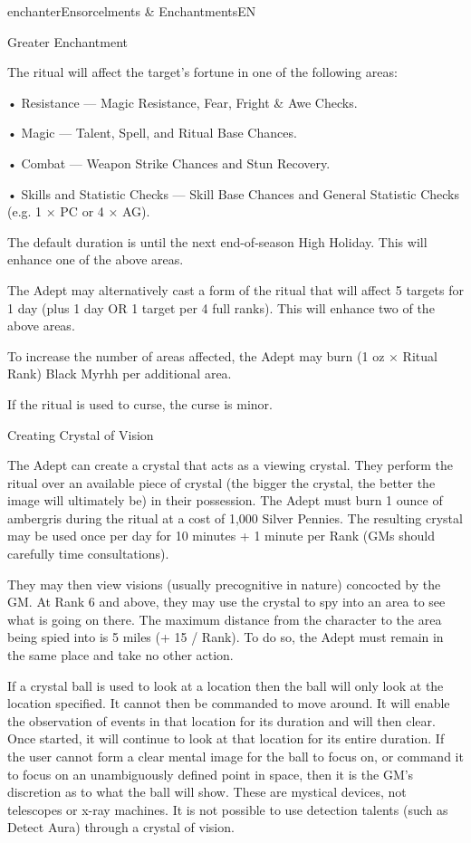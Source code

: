 \begin{College}[1.1]{enchanter}{Ensorcelments \& Enchantments}{EN}
\begin{ritual}[Q-1]{Greater Enchantment}
\begin{effects}
The ritual will affect the target’s fortune in one of 
the following areas:  

• Resistance — Magic Resistance, Fear, Fright \& Awe Checks.

• Magic — Talent, Spell, and Ritual Base Chances.

• Combat — Weapon Strike Chances and Stun Recovery.

• Skills and Statistic Checks — Skill Base Chances and General
Statistic Checks (e.g.  1 × PC or 4 × AG).

The default duration is until the next end-of-season High Holiday.
This will enhance one of the above areas.

The Adept may alternatively cast a form of the ritual that will affect
5 targets for 1 day (plus 1 day OR 1 target per 4 full ranks).  This
will enhance two of the above areas.

To increase the number of areas affected, the Adept may burn (1 oz ×
Ritual Rank) Black Myrhh per additional area.

If the ritual is used to curse, the curse is minor.
\end{effects}
\end{ritual}

\begin{ritual}[Q-2]{Creating Crystal of Vision}

\begin{effects}
The Adept can create a crystal that acts as a viewing crystal.  They
perform the ritual over an available piece of crystal (the bigger the
crystal, the better the image will ultimately be) in their possession.
The Adept must burn 1 ounce of ambergris during the ritual at a cost
of 1,000 Silver Pennies.  The resulting crystal may be used once per
day for 10 minutes + 1 minute per Rank (GMs should carefully time
consultations).

They may then view visions (usually precognitive in nature) concocted
by the GM.  At Rank 6 and above, they may use the crystal to spy into
an area to see what is going on there.  The maximum distance from the
character to the area being spied into is 5 miles (+ 15 / Rank). To do
so, the Adept must remain in the same place and take no other action.

If a crystal ball is used to look at a location then the ball will
only look at the location specified.  It cannot then be commanded to
move around. It will enable the observation of events in that location
for its duration and will then clear. Once started, it will continue
to look at that location for its entire duration.  If the user cannot
form a clear mental image for the ball to focus on, or command it to
focus on an unambiguously defined point in space, then it is the GM’s
discretion as to what the ball will show.  These are mystical devices,
not telescopes or x-ray machines. It is not possible to use detection
talents (such as Detect Aura) through a crystal of vision.
\end{effects}
\end{ritual}


\end{College}
